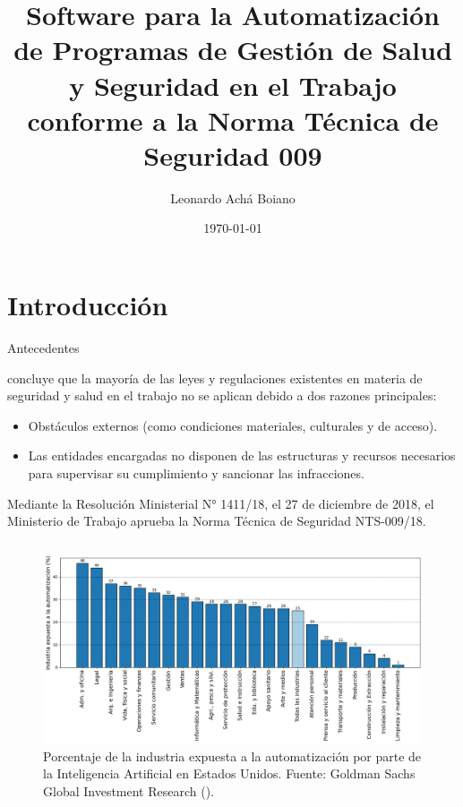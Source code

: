 \documentclass[spanish, aspectratio=169]{beamer}
\title{Software para la Automatización de Programas de Gestión de Salud y Seguridad 
en el Trabajo conforme a la Norma Técnica de Seguridad 009}
\date{\today}
\author{Leonardo Achá Boiano}
\institute{Universidad Católica Boliviana ``San Pablo''}
\begin{document}
\maketitle
  
\section{Introducción}
\begin{frame}[allowframebreaks]{Antecedentes}

  \textcite{cervantesdiagnostico} concluye que la mayoría de las leyes y regulaciones existentes en materia de seguridad y salud en el trabajo no se aplican debido a dos razones principales: 
  \begin{itemize}
    \item Obstáculos externos (como condiciones materiales, culturales y de acceso).
    \item Las entidades encargadas no disponen de las estructuras y recursos necesarios para supervisar su cumplimiento y sancionar las infracciones.
  \end{itemize}
  

  Mediante la Resolución Ministerial N° 1411/18, el 27 de diciembre de 2018, el Ministerio de Trabajo aprueba la Norma Técnica de Seguridad NTS-009/18.

  \framebreak

  \begin{columns}[T]
    \begin{figure}
        \centering
        \includegraphics[width=\textwidth, height=.5\textheight]{../images/marcoref/share_of_industry_exposed_to_automation_ai.png}
        \caption{Porcentaje de la industria expuesta a la automatización por parte de la Inteligencia Artificial en Estados Unidos. Fuente: Goldman Sachs Global Investment Research (\citeyear{hatzius2023potentially}).}
        \label{fig:share_of_industry_exposed_to_automation_ai_gs}
    \end{figure}
    

\end{columns}
\end{frame}
\end{document}

